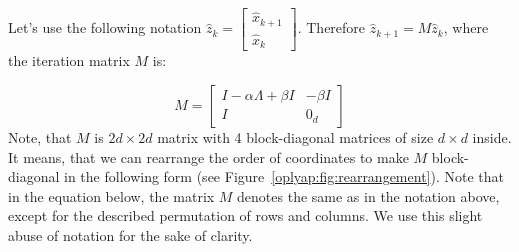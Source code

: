 \documentclass[a4paper,11pt]{article}
\begin{document}
Let’s use the following notation $ \hat{z}_k = \begin{bmatrix} 
 \hat{x}_{k+1} \\
 \hat{x}_{k}
 \end{bmatrix}$. Therefore $\hat{z}_{k+1} = M \hat{z}_k$, where the iteration matrix $M$ is:

\begin{equation}
 M = \begin{bmatrix} 
 I - \alpha \Lambda + \beta I & - \beta I \\
 I & 0_{d}
 \end{bmatrix}
\end{equation}
Note, that $M$ is $2d \times 2d$ matrix with 4 block-diagonal matrices of size $d \times d$ inside. It means, that we can rearrange the order of coordinates to make $M$ block-diagonal in the following form (see Figure~\ref{oplyap:fig:rearrangement}). Note that in the equation below, the matrix $M$ denotes the same as in the notation above, except for the described permutation of rows and columns. We use this slight abuse of notation for the sake of clarity. 
\end{document}
